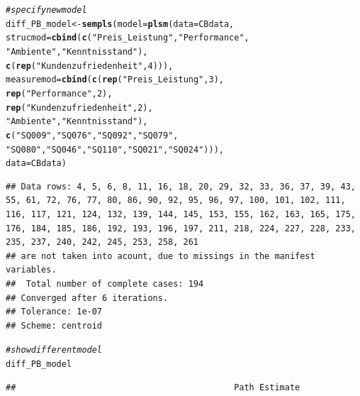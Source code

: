 \documentclass{article}\usepackage[]{graphicx}\usepackage[]{color}
\makeatletter
\newcommand{\hlnum}[1]{\textcolor[rgb]{0.686,0.059,0.569}{#1}}%
\newcommand{\hlstr}[1]{\textcolor[rgb]{0.192,0.494,0.8}{#1}}%
\newcommand{\hlcom}[1]{\textcolor[rgb]{0.678,0.584,0.686}{\textit{#1}}}%
\newcommand{\hlstd}[1]{\textcolor[rgb]{0.345,0.345,0.345}{#1}}%
\newcommand{\hlkwb}[1]{\textcolor[rgb]{0.69,0.353,0.396}{#1}}%
\newcommand{\hlkwc}[1]{\textcolor[rgb]{0.333,0.667,0.333}{#1}}%
\newcommand{\hlkwd}[1]{\textcolor[rgb]{0.737,0.353,0.396}{\textbf{#1}}}%
\newenvironment{kframe}{%
 \def\at@end@of@kframe{}%
 \ifinner\ifhmode%
  \def\at@end@of@kframe{\end{minipage}}%
  \begin{minipage}{\columnwidth}%
 \fi\fi%
 \def\FrameCommand##1{\hskip\@totalleftmargin \hskip-\fboxsep
 \colorbox{shadecolor}{##1}\hskip-\fboxsep
     \hskip-\linewidth \hskip-\@totalleftmargin \hskip\columnwidth}%
 \MakeFramed {\advance\hsize-\width
   \@totalleftmargin\z@ \linewidth\hsize
   \@setminipage}}%
 {\par\unskip\endMakeFramed%
 \at@end@of@kframe}
\newenvironment{knitrout}{}{} %
\makeatother
\begin{document}
\begin{knitrout}
\color{fgcolor}\begin{kframe}
\begin{alltt}
\hlcom{#specify new model}
\hlstd{diff_PB_model} \hlkwb{<-} \hlkwd{sempls}\hlstd{(}\hlkwc{model} \hlstd{=} \hlkwd{plsm}\hlstd{(}\hlkwc{data} \hlstd{= CBdata,}
                        \hlkwc{strucmod} \hlstd{=} \hlkwd{cbind}\hlstd{(}\hlkwd{c}\hlstd{(}\hlstr{"Preis_Leistung"}\hlstd{,}\hlstr{"Performance"}\hlstd{,}
                                           \hlstr{"Ambiente"}\hlstd{,}\hlstr{"Kenntnisstand"}\hlstd{),}
                                         \hlkwd{c}\hlstd{(}\hlkwd{rep}\hlstd{(}\hlstr{"Kundenzufriedenheit"}\hlstd{,}\hlnum{4}\hlstd{))),}
                        \hlkwc{measuremod} \hlstd{=} \hlkwd{cbind}\hlstd{(}\hlkwd{c}\hlstd{(}\hlkwd{rep}\hlstd{(}\hlstr{"Preis_Leistung"}\hlstd{,}\hlnum{3}\hlstd{),}
                                             \hlkwd{rep}\hlstd{(}\hlstr{"Performance"}\hlstd{,}\hlnum{2}\hlstd{),}
                                             \hlkwd{rep}\hlstd{(}\hlstr{"Kundenzufriedenheit"}\hlstd{,}\hlnum{2}\hlstd{),}
                                             \hlstr{"Ambiente"}\hlstd{,}\hlstr{"Kenntnisstand"}\hlstd{),}
                                           \hlkwd{c}\hlstd{(}\hlstr{"SQ009"}\hlstd{,}\hlstr{"SQ076"}\hlstd{,}\hlstr{"SQ092"}\hlstd{,}\hlstr{"SQ079"}\hlstd{,}
                                             \hlstr{"SQ080"}\hlstd{,}\hlstr{"SQ046"}\hlstd{,}\hlstr{"SQ110"}\hlstd{,}\hlstr{"SQ021"}\hlstd{,}\hlstr{"SQ024"}\hlstd{))),}
                        \hlkwc{data} \hlstd{= CBdata)}
\end{alltt}
\begin{verbatim}
## Data rows: 4, 5, 6, 8, 11, 16, 18, 20, 29, 32, 33, 36, 37, 39, 43, 55, 61, 72, 76, 77, 80, 86, 90, 92, 95, 96, 97, 100, 101, 102, 111, 116, 117, 121, 124, 132, 139, 144, 145, 153, 155, 162, 163, 165, 175, 176, 184, 185, 186, 192, 193, 196, 197, 211, 218, 224, 227, 228, 233, 235, 237, 240, 242, 245, 253, 258, 261 
## are not taken into acount, due to missings in the manifest variables.
##  Total number of complete cases: 194 
## Converged after 6 iterations.
## Tolerance: 1e-07
## Scheme: centroid
\end{verbatim}
\begin{alltt}
\hlcom{#show different model}
\hlstd{diff_PB_model}
\end{alltt}
\begin{verbatim}
##                                           Path Estimate

\end{verbatim}
\end{kframe}
\end{knitrout}
\end{document}
